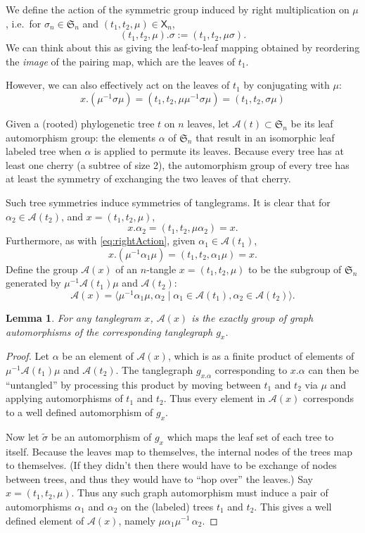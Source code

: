 \documentclass{amsart}
\newtheorem{lemma}{Lemma}
\newcommand{\fS}{\mathfrak S}
\newcommand{\aut}{\mathcal A}
\newcommand{\pairing}{\mu}
\newcommand{\tangle}{\mathsf{X}}
\begin{document}
We define the action of the symmetric group induced by right multiplication on $\pairing$, i.e.\ for $\sigma_n \in \fS_n$ and $(t_1, t_2, \pairing) \in \tangle_n$,
\[
(t_1, t_2, \pairing) . \sigma := (t_1, t_2, \pairing \sigma).
\]
We can think about this as giving the leaf-to-leaf mapping obtained by reordering the \emph{image} of the pairing map, which are the leaves of $t_1$.

However, we can also effectively act on the leaves of $t_1$ by conjugating with $\pairing$:
\begin{equation}
\label{eq:rightAction}
x . (\pairing^{-1} \sigma \pairing)
= (t_1, t_2, \pairing \pairing^{-1} \sigma \pairing)
= (t_1, t_2, \sigma \pairing)
\end{equation}

Given a (rooted) phylogenetic tree $t$ on $n$ leaves, let $\aut(t) \subset \fS_n$ be its leaf automorphism group: the elements $\alpha$ of $\fS_n$ that result in an isomorphic leaf labeled tree when $\alpha$ is applied to permute its leaves.
Because every tree has at least one cherry (a subtree of size 2), the automorphism group of every tree has at least the symmetry of exchanging the two leaves of that cherry.

Such tree symmetries induce symmetries of tanglegrams.
It is clear that for $\alpha_2 \in \aut(t_2)$, and $x = (t_1, t_2, \pairing)$,
\[
x . \alpha_2 = (t_1, t_2, \pairing \alpha_2) = x.
\]
Furthermore, as with \eqref{eq:rightAction}, given $\alpha_1 \in \aut(t_1)$,
\[
x . (\pairing^{-1} \alpha_1 \pairing) = (t_1, t_2, \alpha_1 \pairing) = x.
\]
Define the group $\aut(x)$ of an $n$-tangle $x = (t_1, t_2, \pairing)$ to be the subgroup of $\fS_n$ generated by $\pairing^{-1} \aut(t_1) \pairing$ and $\aut(t_2)$:
\[
\aut(x) = \langle \pairing^{-1} \alpha_1 \pairing, \alpha_2 \mid \alpha_1 \in \aut(t_1), \alpha_2 \in \aut(t_2) \rangle.
\]

\begin{lemma}
For any tanglegram $x$, $\aut(x)$ is the exactly group of graph automorphisms of the corresponding tanglegraph $g_x$.
\end{lemma}
\begin{proof}
Let $\alpha$ be an element of $\aut(x)$, which is as a finite product of elements of $\pairing^{-1} \aut(t_1) \pairing$ and $\aut(t_2)$.
The tanglegraph $g_{x . \alpha}$ corresponding to $x . \alpha$ can then be ``untangled'' by processing this product by moving between $t_1$ and $t_2$ via $\pairing$ and applying automorphisms of $t_1$ and $t_2$.
Thus every element in $\aut(x)$ corresponds to a well defined automorphism of $g_x$.

Now let $\tilde \sigma$ be an automorphism of $g_x$ which maps the leaf set of each tree to itself.
Because the leaves map to themselves, the internal nodes of the trees map to themselves.
(If they didn't then there would have to be exchange of nodes between trees, and thus they would have to ``hop over'' the leaves.)
Say $x = (t_1, t_2, \pairing)$.
Thus any such graph automorphism must induce a pair of automorphisms $\alpha_1$ and $\alpha_2$ on the (labeled) trees $t_1$ and $t_2$.
This gives a well defined element of $\aut(x)$, namely $\pairing \alpha_1 \pairing^{-1} \, \alpha_2$.
\end{proof}
\end{document}
